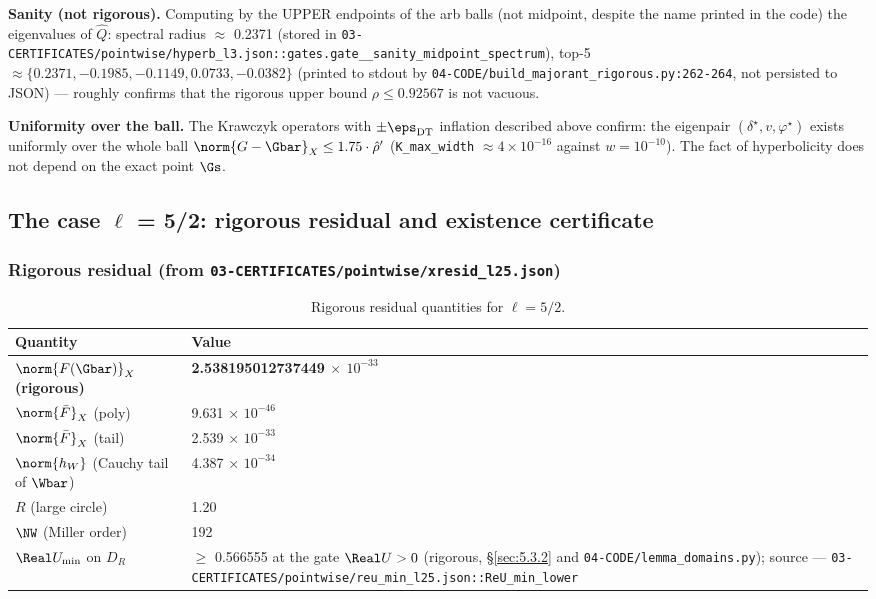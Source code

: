 \textbf{Sanity (not rigorous).} Computing by the UPPER endpoints of the arb
balls (not midpoint, despite the name printed in the code) the eigenvalues of
$\hat{Q}$: spectral radius $\approx$ 0.2371 (stored in
\texttt{03-\allowbreak CERTIFICATES/\allowbreak pointwise/\allowbreak hyperb\_\allowbreak l3.json\allowbreak ::\allowbreak gates.\allowbreak gate\_\_\allowbreak sanity\_\allowbreak midpoint\_\allowbreak spectrum}),
top-5 $\approx \{0.2371, -0.1985, -0.1149, 0.0733, -0.0382\}$ (printed to
stdout by \texttt{04-\allowbreak CODE/\allowbreak build\_\allowbreak majorant\_\allowbreak rigorous.py:262-264}, not persisted
to JSON) --- roughly confirms that the rigorous upper bound $\rho \le 0.92567$
is not vacuous.

\textbf{Uniformity over the ball.} The Krawczyk operators with $\pm
\eps_{\mathrm{DT}}$ inflation described above confirm: the eigenpair
$(\delta^{\star},v,\varphi^{\star})$ exists uniformly over the whole ball
$\norm{G-\Gbar}_X \le 1.75\cdot \hat{\rho}'$ (\texttt{K\_max\_width} $\approx
4\times 10^{-16}$ against $w = 10^{-10}$). The fact of hyperbolicity does not
depend on the exact point $\Gs$.


\subsection{The case $\ell$ = 5/2: rigorous residual and existence certificate}
\label{sec:5.3}

\subsubsection{Rigorous residual (from \texttt{03-\allowbreak CERTIFICATES/\allowbreak pointwise/\allowbreak xresid\_\allowbreak l25.json})}
\label{sec:5.3.1}

\begin{table}[htbp]
\centering
\small
\caption{Rigorous residual quantities for $\ell=5/2$.}
\label{tab:5.3.1-residual}
\begin{tabular}{p{} p{}}
\toprule
Quantity & Value \\
\midrule
\textbf{$\norm{F(\Gbar)}_X$ (rigorous)} & \textbf{2.538195012737449 $\times$ $10^{-33}$} \\
$\norm{\bar{F}}_X$ (poly) & 9.631 $\times$ $10^{-46}$ \\
$\norm{\bar{F}}_X$ (tail) & 2.539 $\times$ $10^{-33}$ \\
$\norm{h_W}$ (Cauchy tail of $\Wbar$) & 4.387 $\times$ $10^{-34}$ \\
$R$ (large circle) & 1.20 \\
$\NW$ (Miller order) & 192 \\
$\Real U_{\min}$ on $D_R$ & $\ge$ 0.566555 at the gate $\Real U > 0$ (rigorous,
\S\ref{sec:5.3.2} and \texttt{04-\allowbreak CODE/\allowbreak lemma\_\allowbreak domains.py}); source ---
\texttt{03-\allowbreak CERTIFICATES/\allowbreak pointwise/\allowbreak reu\_\allowbreak min\_\allowbreak l25.json\allowbreak ::\allowbreak ReU\_\allowbreak min\_\allowbreak lower} \\
\bottomrule
\end{tabular}
\end{table}

